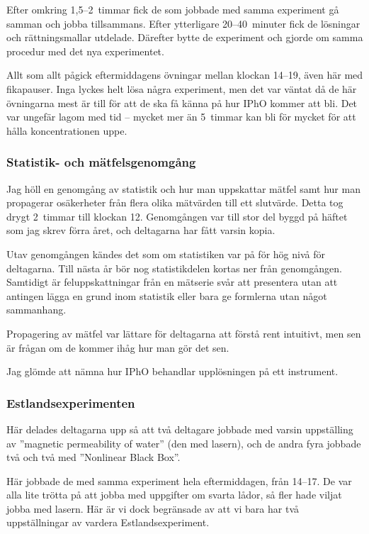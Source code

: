 \documentclass[11pt,a4paper, 
english, swedish %
]{article}
\begin{document}
Efter omkring 1,5--2~timmar fick de som jobbade med samma experiment
gå samman och jobba tillsammans. Efter ytterligare 20--40~minuter fick
de lösningar och rättningsmallar utdelade. Därefter bytte de experiment
och gjorde om samma procedur med det nya experimentet. 

Allt som allt pågick eftermiddagens övningar mellan klockan
14--19, även här med fikapauser. Inga lyckes helt lösa några
experiment, men det var väntat då de här övningarna mest är till för
att de ska få känna på hur IPhO kommer att bli. Det var ungefär lagom
med tid -- mycket mer än 5~timmar kan bli för mycket för att hålla
koncentrationen uppe. 


\subsubsection*{Statistik- och mätfelsgenomgång}
Jag höll en genomgång av statistik och hur man uppskattar mätfel
samt hur man propagerar osäkerheter från flera olika mätvärden till
ett slutvärde. Detta tog drygt 2~timmar till klockan 12. Genomgången
var till stor del byggd på häftet\footnotemark{} som jag skrev förra
året, och deltagarna har fått varsin kopia. 

Utav genomgången kändes det som om statistiken var på för hög nivå
för deltagarna. Till nästa år bör nog statistikdelen kortas ner 
från genomgången. Samtidigt är feluppskattningar från en mätserie svår
att presentera utan att antingen lägga en grund inom statistik eller
bara ge formlerna utan något sammanhang.

Propagering av mätfel var lättare för deltagarna att förstå rent
intuitivt, men sen är frågan om de kommer ihåg hur man gör det sen. 

Jag glömde att nämna hur IPhO behandlar upplösningen på ett
instrument. 



\subsubsection*{Estlandsexperimenten}
Här delades deltagarna upp så att två deltagare jobbade med varsin
uppställing av ''magnetic permeability of water'' (den med lasern),
och de andra fyra jobbade två och två med ''Nonlinear Black Box''.

Här jobbade de med samma experiment hela eftermiddagen, från
14--17. De var alla lite trötta på att jobba med uppgifter om svarta
lådor, så fler hade viljat jobba med lasern. Här är vi dock begränsade
av att vi bara har två uppställningar av vardera Estlandsexperiment. 
\end{document}
